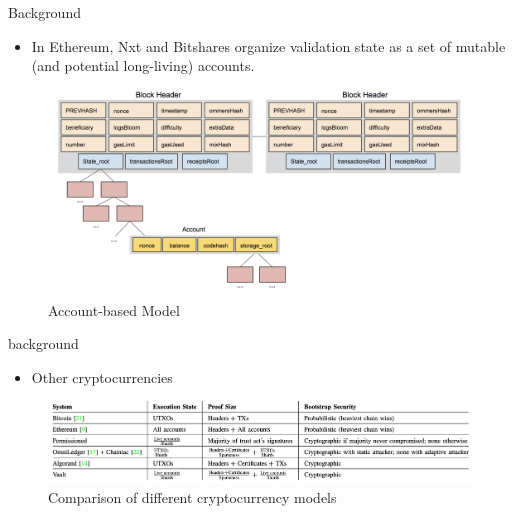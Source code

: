 \documentclass[biblatex,aspectratio=169,11pt]{mybeamer}
\begin{document}
\begin{frame}{Background}
  \begin{itemize}
    \item In Ethereum, Nxt and Bitshares organize \alert{validation state} as a set of mutable (and potential long-living) \alert{accounts}.
  \end{itemize}
  \vspace{-1em}
  \begin{figure}
    \includegraphics[width=0.7\linewidth]{figs/account.png}
    \caption{Account-based Model}
  \end{figure}
\end{frame}

\begin{frame}{background}
  \begin{itemize}
    \item Other cryptocurrencies
  \end{itemize}
  \vspace{-1em}
  \begin{figure}
    \includegraphics[width=0.9\linewidth]{figs/summary.png}
    \caption{Comparison of different cryptocurrency models }
  \end{figure}
\end{frame}
\end{document}

